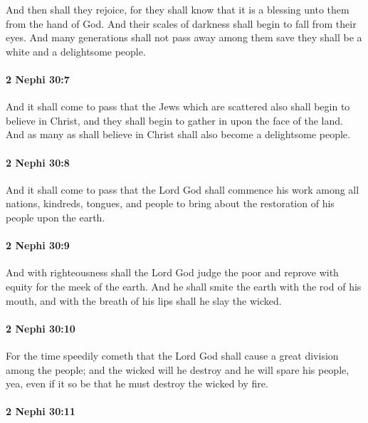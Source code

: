 			And then shall they rejoice,
			for they shall know that it is a blessing unto them from the hand of God.
			And their scales of darkness shall begin to fall from their eyes.
			And many generations shall not pass away among them
			save they shall be a white and a delightsome people.

		\paragraph{2 Nephi 30:7} %
			\label{2NEPHI-30-7}

			And it shall come to pass that the Jews which are scattered
			also shall begin to believe in Christ,
			and they shall begin to gather in upon the face of the land.
			And as many as shall believe in Christ shall also become a delightsome people.

		\paragraph{2 Nephi 30:8} %
			\label{2NEPHI-30-8}

			And it shall come to pass that
			the Lord God shall commence his work
			among all nations, kindreds, tongues, and people
			to bring about the restoration of his people upon the earth.

		\paragraph{2 Nephi 30:9} %
			\label{2NEPHI-30-9}

			And with righteousness shall the Lord God judge the poor
			and reprove with equity for the meek of the earth.
			And he shall smite the earth with the rod of his mouth,
			and with the breath of his lips shall he slay the wicked.

		\paragraph{2 Nephi 30:10} %
			\label{2NEPHI-30-10}

			For the time speedily cometh
			that the Lord God shall cause a great division among the people;
			and the wicked will he destroy and he will spare his people,
			yea, even if it so be that he must destroy the wicked by fire.

		\paragraph{2 Nephi 30:11} %
			\label{2NEPHI-30-11}

